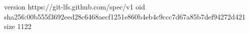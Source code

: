 version https://git-lfs.github.com/spec/v1
oid sha256:00b555f3692eed28c6468aecf1251e860b4eb4c9ccc7d67a85b7def94272d421
size 1122
